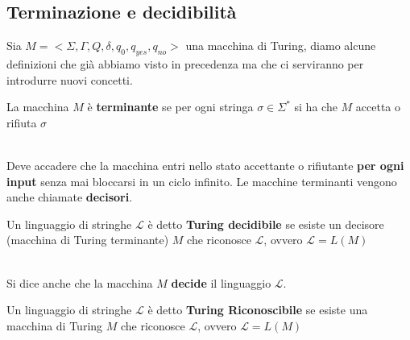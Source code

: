 \subsection{Terminazione e decidibilità}
Sia $M = <\Sigma,\Gamma, Q, \delta, q_0,q_{yes},q_{no}>$ una macchina di Turing, diamo alcune definizioni che già abbiamo visto in precedenza ma che ci serviranno per introdurre nuovi concetti.\smallskip\\
\colorbox{SALZO}{\parbox{\dimexpr\linewidth-2\fboxsep}{\begin{definition}
   La macchina $M$ è \textbf{terminante} se per ogni stringa $\sigma \in \Sigma^*$ si ha che $M$ accetta o rifiuta $\sigma$
\end{definition}}}\smallskip\\
Deve accadere che la macchina entri nello stato accettante o rifiutante \textbf{per ogni input} senza mai bloccarsi in un ciclo infinito. Le macchine terminanti vengono anche chiamate \textbf{decisori}.\smallskip\\
\colorbox{SALZO}{\parbox{\dimexpr\linewidth-2\fboxsep}{\begin{definition}
   Un linguaggio di stringhe $\mathcal{L}$ è detto \textbf{Turing decidibile} se esiste un decisore (macchina di Turing terminante) $M$ che riconosce $\mathcal{L}$, ovvero $\mathcal{L} = L(M)$
\end{definition}}}\smallskip\\
Si dice anche che la macchina $M$ \textbf{decide} il linguaggio $\mathcal{L}$.\smallskip\\
\noindent \colorbox{SALZO}{\parbox{\dimexpr\linewidth-2\fboxsep}{\begin{definition}
   Un linguaggio di stringhe $\mathcal{L}$ è detto \textbf{Turing Riconoscibile} se esiste una macchina di Turing $M$ che riconosce $\mathcal{L}$, ovvero $\mathcal{L} = L(M)$
\end{definition}}}




